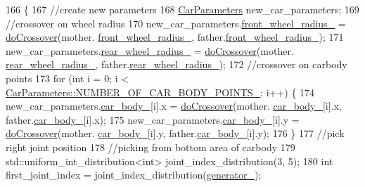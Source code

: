 \begin{DoxyCode}
166                                                                                                            
            \{
167     \textcolor{comment}{//create new parameters}
168     \hyperlink{classCarParameters}{CarParameters} new\_car\_parameters;
169     \textcolor{comment}{//crossover on wheel radius}
170     new\_car\_parameters.\hyperlink{classCarParameters_ab66832af7618ebe04364630c92850096}{front\_wheel\_radius\_} = \hyperlink{classEvolutionaryAlgorithm_a1f0c3d66b8abfdcdf6eedf065580cef6}{doCrossover}(mother.
      \hyperlink{classCarParameters_ab66832af7618ebe04364630c92850096}{front\_wheel\_radius\_}, father.\hyperlink{classCarParameters_ab66832af7618ebe04364630c92850096}{front\_wheel\_radius\_});
171     new\_car\_parameters.\hyperlink{classCarParameters_a6d3c3fc1c4eef292a7f536da2a089bbd}{rear\_wheel\_radius\_} = \hyperlink{classEvolutionaryAlgorithm_a1f0c3d66b8abfdcdf6eedf065580cef6}{doCrossover}(mother.
      \hyperlink{classCarParameters_a6d3c3fc1c4eef292a7f536da2a089bbd}{rear\_wheel\_radius\_}, father.\hyperlink{classCarParameters_a6d3c3fc1c4eef292a7f536da2a089bbd}{rear\_wheel\_radius\_});
172     \textcolor{comment}{//crossover on carbody points}
173     \textcolor{keywordflow}{for} (\textcolor{keywordtype}{int} i = 0; i < \hyperlink{classCarParameters_a9cd45ac0f506d33d551c86eff1e0fa05}{CarParameters::NUMBER\_OF\_CAR\_BODY\_POINTS\_};
       i++) \{
174         new\_car\_parameters.\hyperlink{classCarParameters_a304345d7fd7771c87421e87785bce810}{car\_body\_}[i].x = \hyperlink{classEvolutionaryAlgorithm_a1f0c3d66b8abfdcdf6eedf065580cef6}{doCrossover}(mother.
      \hyperlink{classCarParameters_a304345d7fd7771c87421e87785bce810}{car\_body\_}[i].x, father.\hyperlink{classCarParameters_a304345d7fd7771c87421e87785bce810}{car\_body\_}[i].x);
175         new\_car\_parameters.\hyperlink{classCarParameters_a304345d7fd7771c87421e87785bce810}{car\_body\_}[i].y = \hyperlink{classEvolutionaryAlgorithm_a1f0c3d66b8abfdcdf6eedf065580cef6}{doCrossover}(mother.
      \hyperlink{classCarParameters_a304345d7fd7771c87421e87785bce810}{car\_body\_}[i].y, father.\hyperlink{classCarParameters_a304345d7fd7771c87421e87785bce810}{car\_body\_}[i].y);
176     \}
177     \textcolor{comment}{//pick right joint position}
178     \textcolor{comment}{//picking from bottom area of carbody}
179     std::uniform\_int\_distribution<int> joint\_index\_distribution(3, 5);
180     \textcolor{keywordtype}{int} first\_joint\_index = joint\_index\_distribution(\hyperlink{classEvolutionaryAlgorithm_adbd823d385ad95bf20496fd2fc25ccde}{generator\_});

\end{DoxyCode}
